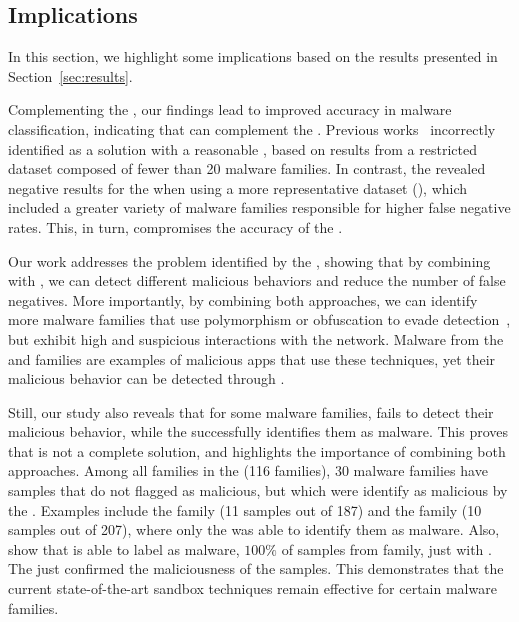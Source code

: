 \subsection{Implications}\label{sec:implications}

In this section, we highlight some implications based on the results presented in Section~\ref{sec:results}.

Complementing the \fhc, our findings lead to improved accuracy in malware classification, indicating that \net can complement the \mas. Previous works~\cite{DBLP:conf/wcre/BaoLL18,DBLP:conf/iceccs/LeB0GL18,DBLP:journals/jss/CostaMMSSBNR22} incorrectly identified \mas as a solution with a reasonable \fone, based on results from a restricted dataset composed of fewer than 20 malware families. In contrast, the \fhc revealed negative results for the \mas when using a more representative dataset (\cds), which included a greater variety of malware families responsible for higher false negative rates. This, in turn, compromises the accuracy of the \mas.


Our work addresses the problem identified by the \fhc, showing that by combining \mas with \net, we can detect different malicious behaviors and reduce the number of false negatives. More importantly, by combining both approaches, we can identify more malware families that use polymorphism or obfuscation to evade detection~\cite{DBLP:conf/acsac/MoserKK07}, but exhibit high and suspicious interactions with the network. Malware from the \gps and \tjk families are examples of malicious apps that use these techniques, yet their malicious behavior can be detected through \net.

Still, our study also reveals that for some malware families, \net fails to detect their malicious behavior, while the \mas successfully identifies them as malware. This proves that \net is not a complete solution, and highlights the importance of combining both approaches. Among all families in the \cds 
 (116 families), 30 malware families have samples that \net do not flagged as malicious, but which were identify as malicious by the \mas. Examples include the  family (11 samples out of 187) and the  family (10 samples out of 207), where only the \mas was able to identify them as malware. Also, \fhc show that \mas is able to label as malware, $100\%$ of samples from  family, just with \mas. The \net just confirmed the maliciousness of the samples. This demonstrates that the current state-of-the-art sandbox techniques remain effective for certain malware families.

